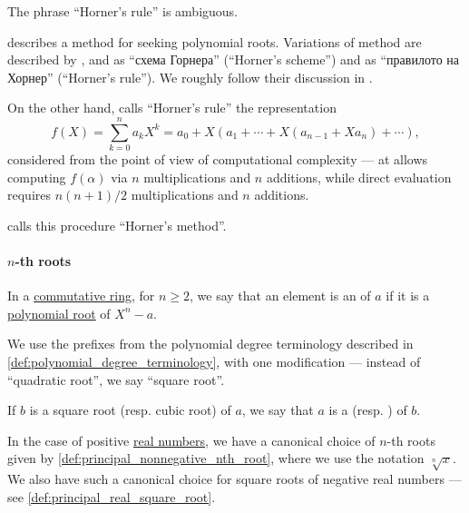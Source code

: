 \begin{remark}\label{rem:alg:horners_rule}
  The phrase \enquote{Horner's rule} is ambiguous.

   describes a method for seeking polynomial roots. Variations of method are described by ,  and  as \enquote{схема Горнера} (\enquote{Horner's scheme}) and  as \enquote{правилото на Хорнер} (\enquote{Horner's rule}). We roughly follow their discussion in .

  On the other hand,  calls \enquote{Horner's rule} the representation
  \begin{equation}\label{eq:rem:alg:horners_rule/knuth}
    f(X) = \sum_{k=0}^n a_k X^k = a_0 + X (a_1 + \cdots + X(a_{n-1} + X a_n) + \cdots),
  \end{equation}
  considered from the point of view of computational complexity --- at allows computing \( f(\alpha) \) via \( n \) multiplications and \( n \) additions, while direct evaluation requires  \( {n(n+1)} / 2 \) multiplications and \( n \) additions.

   calls this procedure \enquote{Horner's method}.
\end{remark}

\paragraph{\( n \)-th roots}

\begin{definition}\label{def:nth_root}\mimprovised
  In a \hyperref[def:ring/commutative]{commutative ring}, for \( n \geq 2 \), we say that an element is an  of \( a \) if it is a \hyperref[def:root_of_polynomial]{polynomial root} of \( X^n - a \).

  We use the prefixes from the polynomial degree terminology described in \cref{def:polynomial_degree_terminology}, with one modification --- instead of \enquote{quadratic root}, we say \enquote{square root}.

  If \( b \) is a square root (resp. cubic root) of \( a \), we say that \( a \) is a  (resp. ) of \( b \).
\end{definition}
\begin{comments}
  \item In the case of positive \hyperref[def:real_numbers]{real numbers}, we have a canonical choice of \( n \)-th roots given by \cref{def:principal_nonnegative_nth_root}, where we use the notation \( \sqrt[n]{ x } \). We also have such a canonical choice for square roots of negative real numbers --- see \cref{def:principal_real_square_root}.
\end{comments}

